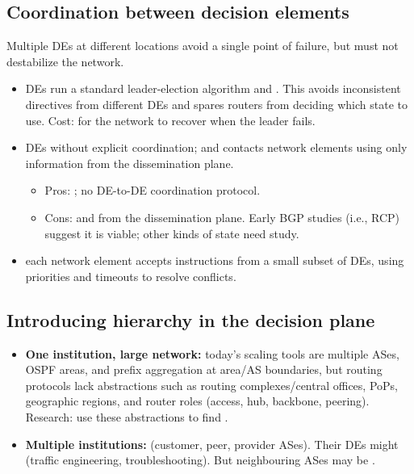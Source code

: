 \subsection{Coordination between decision elements}
Multiple DEs at different locations avoid a single point of failure, but must not destabilize the network.
\begin{itemize}
\item {} DEs run a standard leader-election algorithm and . This avoids inconsistent directives from different DEs and spares routers from deciding which state to use. Cost:  for the network to recover when the leader fails.
\item {} DEs  without explicit coordination;  and contacts network elements using only information from the dissemination plane. 
\begin{itemize}
\item Pros: ; no DE-to-DE coordination protocol.
\item Cons:  and  from the dissemination plane. Early BGP studies (i.e., RCP) suggest it is viable; other kinds of state need study.
\end{itemize}
\item {} each network element accepts instructions from a small subset of DEs, using priorities and timeouts to resolve conflicts.
\end{itemize}

\subsection{Introducing hierarchy in the decision plane}
\begin{itemize}
\item \textbf{One institution, large network:} today's scaling tools are multiple ASes, OSPF areas, and prefix aggregation at area/AS boundaries, but routing protocols lack abstractions such as routing complexes/central offices, PoPs, geographic regions, and router roles (access, hub, backbone, peering). Research: use these abstractions to find .
\item \textbf{Multiple institutions:}  (customer, peer, provider ASes). Their DEs might  (traffic engineering, troubleshooting). But neighbouring ASes may be .
\end{itemize}

